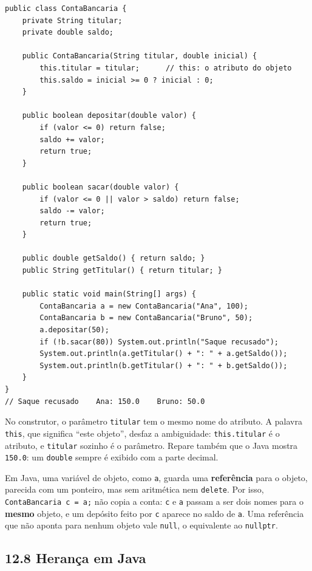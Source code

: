 \begin{codigo}
\begin{Verbatim}[breaklines=true, breaksymbolleft={}, fontsize=\footnotesize]
public class ContaBancaria {
    private String titular;
    private double saldo;

    public ContaBancaria(String titular, double inicial) {
        this.titular = titular;      // this: o atributo do objeto
        this.saldo = inicial >= 0 ? inicial : 0;
    }

    public boolean depositar(double valor) {
        if (valor <= 0) return false;
        saldo += valor;
        return true;
    }

    public boolean sacar(double valor) {
        if (valor <= 0 || valor > saldo) return false;
        saldo -= valor;
        return true;
    }

    public double getSaldo() { return saldo; }
    public String getTitular() { return titular; }

    public static void main(String[] args) {
        ContaBancaria a = new ContaBancaria("Ana", 100);
        ContaBancaria b = new ContaBancaria("Bruno", 50);
        a.depositar(50);
        if (!b.sacar(80)) System.out.println("Saque recusado");
        System.out.println(a.getTitular() + ": " + a.getSaldo());
        System.out.println(b.getTitular() + ": " + b.getSaldo());
    }
}
// Saque recusado    Ana: 150.0    Bruno: 50.0
\end{Verbatim}
\end{codigo}

No construtor, o parâmetro \texttt{titular} tem o mesmo nome do atributo. A palavra \texttt{this}, que significa ``este objeto'', desfaz a ambiguidade: \texttt{this.titular} é o atributo, e \texttt{titular} sozinho é o parâmetro. Repare também que o Java mostra \texttt{150.0}: um \texttt{double} sempre é exibido com a parte decimal.

Em Java, uma variável de objeto, como \texttt{a}, guarda uma \textbf{referência} para o objeto, parecida com um ponteiro, mas sem aritmética nem \texttt{delete}. Por isso, \texttt{ContaBancaria c = a;} não copia a conta: \texttt{c} e \texttt{a} passam a ser dois nomes para o \textbf{mesmo} objeto, e um depósito feito por \texttt{c} aparece no saldo de \texttt{a}. Uma referência que não aponta para nenhum objeto vale \texttt{null}, o equivalente ao \texttt{nullptr}.

\subsection{12.8 Herança em Java}

